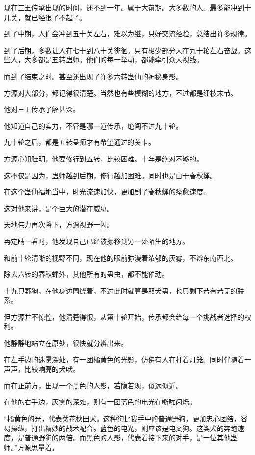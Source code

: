 \begin{this_body}
现在三王传承出现的时间，还不到一年。属于大前期。大多数的人。最多能冲到十几关，就已经很了不起了。

到了中期，人们会冲到五十关左右，难以为继，只好交流经验，总结出许多规律。

到了后期，多数让人在七十到八十关徘徊。只有极少部分人在九十轮左右奋战。这些人，大多都是五转蛊师。他们的每一举动，都能牵引众人视线。

而到了结束之时。甚至还出现了许多六转蛊仙的神秘身影。

方源对大部分，都记得很清楚。当然也有些模糊的地方，不过都是细枝末节。

他对三王传承了解甚深。

他知道自己的实力，不管是哪一道传承，绝闯不过九十轮。

九十轮之后，都是五转蛊师才有希望通过的关卡。

方源心知肚明，他要修行到五转，比较困难。十年是绝对不够的。

这不仅是因为，蛊师越到后期，修行越加困难。同时也是由于春秋蝉。

在这个蛊仙福地当中，时光流速加快，更加剧了春秋蝉的痊愈速度。

这对他来讲，是个巨大的潜在威胁。

天地伟力再次降下，方源视野一闪。

再定睛一看时，他发现自己已经被挪移到另一处陌生的地方。

和前十轮清晰的视野不同，现在他的眼前弥漫着浓郁的灰雾，不辨东南西北。

除去六转的春秋蝉外，其他所有的蛊虫，都不能催动。

十九只野狗，在他身边围绕着，不过此时就算是驭犬蛊，也只剩下若有若无的联系。

但方源并不惊惶，他清楚得很，从第十轮开始，传承都会给每一个挑战者选择的权利。

他静静地站立在原处，很快就分辨出来。

在左手边的迷雾深处，有一团橘黄色的光影，仿佛有人在打着灯笼。同时伴随着一声声，比较响亮的犬吠。

而在正前方，出现一个黑色的人影，若隐若现，似远似近。

在他的右手边，灰雾的深处，则有一团蓝色的电光在噼啪闪烁。

“橘黄色的光，代表菊花秋田犬。这种狗比我手中的普通野狗，更加忠心团结，容易操纵，打出精妙的战术配合。蓝色的电光，则应该是电文狗。这类犬的奔跑速度，是普通野狗的两倍。而黑色的人影，代表着接下来的对手，是一位其他蛊师。”方源思量着。


\end{this_body}
